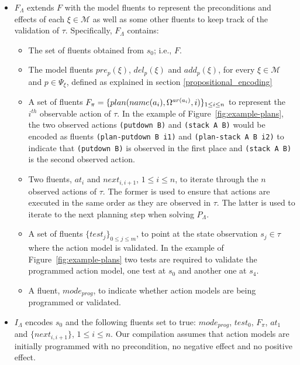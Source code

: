 \begin{itemize}

\item $F_{\Lambda}$ \textcolor[rgb]{1.00,0.00,0.00}{extends $F$ with the model fluents to represent the preconditions and effects of each $\xi\in\mathcal{M}$ as well as some other fluents to keep track of the validation of $\tau$}. Specifically, $F_{\Lambda}$ contains:
\begin{itemize}
\item The set of fluents obtained from $s_0$; i.e., $F$.
\item The \textcolor[rgb]{1.00,0.00,0.00}{model fluents} $pre_p(\xi)$, $del_p(\xi)$ and $add_p(\xi)$, for every $\xi \in \mathcal{M}$ and $p\in \Psi_{\xi}$, defined as explained in section \ref{propositional_encoding}
\item A set of fluents $F_{\pi}=\{plan(name(a_i),\Omega^{ar(a_i)},i)\}_{\small 1\leq i\leq n}$ to represent the $i^{th}$ observable action of $\tau$. In the example of Figure~\ref{fig:example-plans}, the two observed actions {\small \texttt{(putdown B)}} and {\small \texttt{(stack  A  B)}} would be encoded as fluents  {\small \texttt{(plan-putdown B i1)}} and {\small \texttt{(plan-stack A B i2)}} to indicate that {\small \texttt{(putdown B)}} is observed in the first place and {\small \texttt{(stack  A  B)}} is the second observed action.
\item Two fluents, $at_i$ and $next_{i,i+1}$, {\small $1\leq i \leq n$}, to iterate through the $n$ observed actions of $\tau$. The former is used to ensure that actions are executed in the same order as they are observed in $\tau$. The latter is used to iterate to the next planning step when solving $P_{\Lambda}$.
\item A set of fluents $\{test_j\}_{0\leq j\leq m}$, to point at the state observation $s_j\in\tau$ where the action model is
validated. In the example of Figure~\ref{fig:example-plans} two tests are required to validate the programmed action model, one test at $s_0$ and another one at $s_4$.
\item A fluent, $mode_{prog}$, to indicate whether action models are being programmed or validated.
\end{itemize}

\item $I_{\Lambda}$ encodes $s_0$ and the following fluents set to true: $mode_{prog}$, $test_0$, $F_{\pi}$, $at_1$ and $\{next_{i,i+1}\}$, {\small $1\leq i \leq n$}. Our compilation assumes that action models are initially programmed with no precondition, no negative effect and no positive effect.


\end{itemize}

